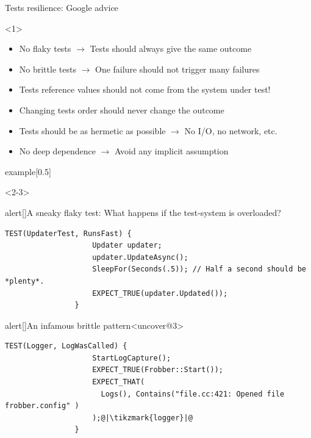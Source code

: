 \begin{frame}[fragile]{Tests resilience: Google advice}
    \begin{onlyenv}<1>
        \begin{itemize}
            \setlength{\itemsep}{2mm}
            \item No flaky tests $\to$ Tests should always give the same outcome
            \item No brittle tests $\to$ One failure should not trigger many failures
            \item Tests reference values should not come from the system under test!
            \item Changing tests order should never change the outcome
            \item Tests should be as hermetic as possible $\to$ No I/O, no network, etc.
            \item No deep dependence $\to$ Avoid any implicit assumption
        \end{itemize}
        \vspace{3mm}
        \begin{varblock}{example}[0.5\textwidth]{}
            \large\bfseries{}
        \end{varblock}
    \end{onlyenv}
    \begin{onlyenv}<2-3>
        \begin{varblock}{alert}[\textwidth]{A sneaky flaky test: What happens if the test-system is overloaded?}
            \begin{lstlisting}[style=MyCpp]
                TEST(UpdaterTest, RunsFast) {
                    Updater updater;
                    updater.UpdateAsync();
                    SleepFor(Seconds(.5)); // Half a second should be *plenty*.
                    EXPECT_TRUE(updater.Updated());
                }
            \end{lstlisting}
        \end{varblock}
        \begin{varblock}{alert}[\textwidth]{An infamous brittle pattern}<uncover@3>
            \begin{lstlisting}[style=MyCpp]
                TEST(Logger, LogWasCalled) {
                    StartLogCapture();
                    EXPECT_TRUE(Frobber::Start());
                    EXPECT_THAT(
                      Logs(), Contains("file.cc:421: Opened file frobber.config" )
                    );@|\tikzmark{logger}|@
                }

\end{lstlisting}
\end{varblock}
\end{onlyenv}
\end{frame}
